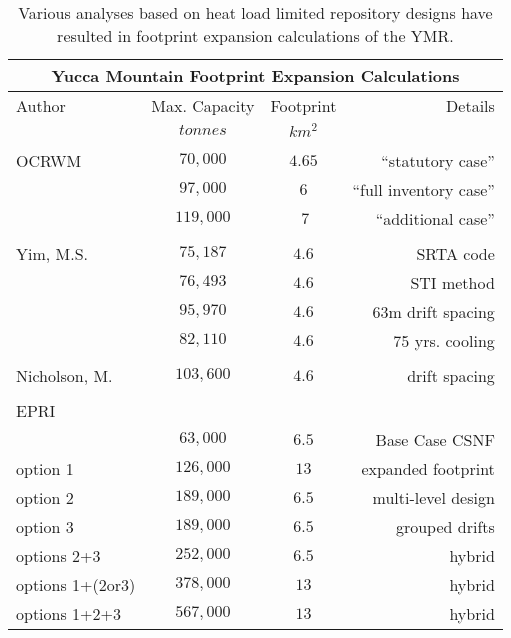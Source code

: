 \begin{table}[h!]
  \centering
      \footnotesize{
      \begin{tabular}{|l|c|c|r|}
          \multicolumn{4}{c}{\textbf{Yucca Mountain Footprint Expansion Calculations}}\\
          \hline
          Author&Max. Capacity&Footprint&Details\\
          &$tonnes$&$km^2$&\\
          \hline
          &&&\\
          OCRWM&$70,000$&$4.65$&``statutory case''\\
          &$97,000$&$6$&``full inventory case''\\
          &$119,000$&$~7$&``additional case''\\
          \hline
          &&&\\
          Yim, M.S.&$75,187$&$4.6$&SRTA code\\
          &$76,493$&$4.6$&STI method\\
          &$95,970$&$4.6$&$63$m drift spacing\\
          &$82,110$&$4.6$&75 yrs. cooling\\
          \hline
          &&&\\
          Nicholson, M.&$103,600$&$4.6$&drift spacing\\
          \hline
          &&&\\
          EPRI&&&\\
          &$63,000$&$6.5$&Base Case CSNF\\
          option 1&$126,000$&$13$&expanded footprint\\
          option 2&$189,000$&$6.5$&multi-level design\\
          option 3&$189,000$&$6.5$&grouped drifts\\
          options 2+3&$252,000$&$6.5$&hybrid\\
          options 1+(2or3) &$378,000$&$13$&hybrid\\
          options 1+2+3 &$567,000$&$13$&hybrid\\
          \hline
        \end{tabular}
        \caption[Yucca Mountain Footprint Expansion Calculations]{Various analyses based on heat 
        load limited repository designs have resulted in footprint expansion calculations of the 
        YMR.} 
        \label{tab:footprint}
        }
      \end{table}
